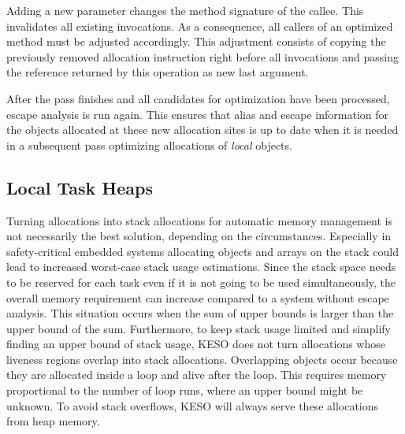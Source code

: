 			Adding a new parameter changes the method signature of the callee. This invalidates all existing invocations. As
			a consequence, all callers of an optimized method must be adjusted accordingly. This adjustment consists of
			copying the previously removed allocation instruction right before all invocations and passing the reference
			returned by this operation as new last argument.

			After the pass finishes and all candidates for optimization have been processed, escape analysis is run again.
			This ensures that alias and escape information for the objects allocated at these new allocation sites is up to
			date when it is needed in a subsequent pass optimizing allocations of \emph{local} objects.

		\subsection{Local Task Heaps}
			\label{sub:eea:opt:ldh}
			Turning allocations into stack allocations for automatic memory management is not necessarily the best solution,
			depending on the circumstances. Especially in safety-critical embedded systems allocating objects and arrays on
			the stack could lead to increased worst-case stack usage estimations. Since the stack space needs to be reserved
			for each task even if it is not going to be used simultaneously, the overall memory requirement can increase
			compared to a system without escape analysis. This situation occurs when the sum of upper bounds is larger than
			the upper bound of the sum. Furthermore, to keep stack usage limited and simplify finding an upper bound of stack
			usage, KESO does not turn allocations whose liveness regions overlap into stack allocations. Overlapping objects
			occur because they are allocated inside a loop and alive after the loop. This requires memory proportional to the
			number of loop runs, where an upper bound might be unknown. To avoid stack overflows, KESO will always serve these
			allocations from heap memory.

